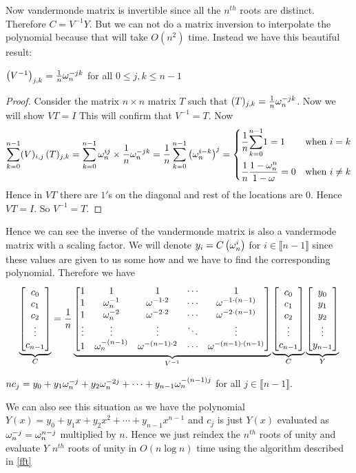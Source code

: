  Now vandermonde matrix is invertible since all the $n^{th}$ roots are distinct. Therefore $C=V^{-1}Y$. But we can not do a matrix inversion to interpolate the polynomial because that will take $O(n^2)$ time. Instead we have this beautiful result:
 \begin{lemma}{}{}
 	$\left(V^{-1}\right)_{j,k}=\frac1n\omega_n^{-jk}$ for all $0\leq j,k\leq n-1$
 \end{lemma}
\begin{proof}
	Consider the matrix $n\times n$ matrix $T$ such that $(T)_{j,k}=\frac1n\omega_n^{-jk}$. Now we will show $VT=I$ This will confirm that $V^{-1}=T$. Now $$\sum_{k=0}^{n-1} (V)_{i,j}\, (T)_{j,k}=\sum_{k=0}^{n-1} \omega^{ij}_n\times \frac1n\omega_n^{-jk}=\frac1n\sum_{k=0}^{n-1}\left(\omega^{i-k}_n\right)^j=\begin{cases}
		\dfrac1n\displaystyle{\sum\limits_{k=0}^{n-1}}1=1& \text{when $i=k$}\\[5mm] \dfrac1n \dfrac{1-\omega^n_n}{1-\omega} =0 & \text{when $i\neq k$}
	\end{cases} $$Hence in $VT$ there are $1'$s on the diagonal and rest of the locations are $0$. Hence $VT=I$. So $V^{-1}=T$.
\end{proof}
Hence we can see the inverse of the vandermonde matrix is also a vandermode matrix with a scaling factor. We will denote $y_i=C\left(\omega_n^{i}\right)$ for $i\in\llbracket n-1\rrbracket$ since these values are given to us some how and we have to find the corresponding polynomial. Therefore we have $$\underbrace{\left[\begin{matrix}c_0\\ c_1\\ c_2\\ \vdots \\ c_{n-1}\end{matrix}\right]}_{C}=\frac1n\underbrace{\left[\begin{matrix}1 & 1 & 1& \cdots & 1\\  1 & \omega^{-1}_n & \omega ^{-1\cdot 2}& \cdots & \omega^{-1\cdot (n-1)}\\ 1 & \omega^{-2}_n & \omega ^{-2\cdot 2}& \cdots & \omega^{-2\cdot (n-1)}\\ \vdots & \vdots & \vdots & \ddots & \vdots\\ 1 & \omega^{-(n-1)}_n & \omega ^{-(n-1)\cdot 2}& \cdots & \omega^{-(n-1)\cdot (n-1)}\end{matrix}\right]}_{V^{-1}}\underbrace{\left[\begin{matrix}c_0\\ c_1\\ c_2\\ \vdots \\ c_{n-1}\end{matrix}\right]}_{C}\underbrace{\left[\begin{matrix}y_0\\ y_1\\ y_2\\ \vdots\\ y_{n-1}\end{matrix}\right]}_{Y}$$
\begin{observation*}
	$nc_j=y_0+y_1\omega_n^{-j}+y_2\omega_n^{-2j}+\cdots+y_{n-1}\omega_n^{-(n-1)j}$ for all $j\in\llbracket n-1\rrbracket$.
\end{observation*}
We can also see this situation as we have the polynomial $Y(x)=y_0+y_1x+y_2x^2+\cdots +y_{n-1}x^{n-1}$ and $c_j$ is just $Y(x)$ evaluated as $\omega^{-j}_n=\omega_n^{n-j}$ multiplied by $n$. Hence we just reindex the $n^{th}$ roots of unity and evaluate $Y$ $n^{th}$ roots of unity in $O(n\log n)$ time using the algorithm described in \autoref{fft}